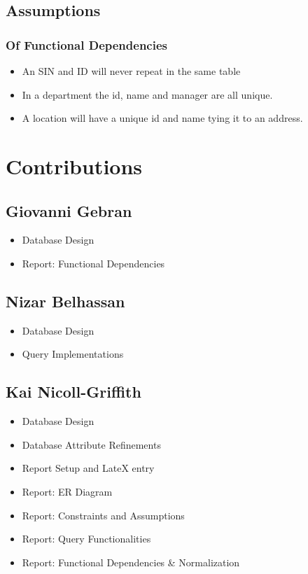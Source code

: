\documentclass[fleqn, 11pt,letterpaper]{article}
\begin{document}
\subsection{Assumptions}
\subsubsection{Of Functional Dependencies}
\begin{itemize}
	\item An SIN and ID will never repeat in the same table
	\item In a department the id, name and manager are all unique.
	\item A location will have a unique id and name tying it to an address.
\end{itemize}
\pagebreak

\section{Contributions}
\subsection{Giovanni Gebran}
 \begin{itemize}
\item Database Design
\item Report: Functional Dependencies
\end{itemize}
\subsection{Nizar Belhassan}
 \begin{itemize}
\item Database Design
\item Query Implementations
\end{itemize}
\subsection{Kai Nicoll-Griffith}
 \begin{itemize}
\item Database Design
\item Database Attribute Refinements
\item Report Setup and LateX entry
\item Report: ER Diagram
\item Report: Constraints and Assumptions
\item Report: Query Functionalities
\item Report: Functional Dependencies \& Normalization
\end{itemize}
\end{document}
